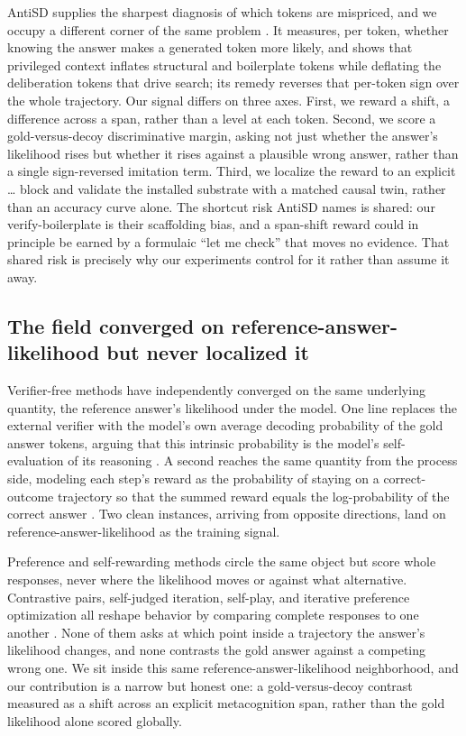 AntiSD supplies the sharpest diagnosis of which tokens are mispriced, and we
occupy a different corner of the same problem \citep{shen2026antisd}. It measures,
per token, whether knowing the answer makes a generated token more likely, and
shows that privileged context inflates structural and boilerplate tokens while
deflating the deliberation tokens that drive search; its remedy reverses that
per-token sign over the whole trajectory. Our signal differs on three axes.
First, we reward a shift, a difference across a span, rather than a level at each
token. Second, we score a gold-versus-decoy discriminative margin, asking not
just whether the answer's likelihood rises but whether it rises against a
plausible wrong answer, rather than a single sign-reversed imitation term.
Third, we localize the reward to an explicit \metaopen{}\dots\metaclose{} block
and validate the installed substrate with a matched causal twin, rather than an
accuracy curve alone. The shortcut risk AntiSD names is shared: our
verify-boilerplate is their scaffolding bias, and a span-shift reward could in
principle be earned by a formulaic ``let me check'' that moves no evidence. That
shared risk is precisely why our experiments control for it rather than assume it
away.

\subsection{The field converged on reference-answer-likelihood but never localized it}
\label{sec:related:likelihood}

Verifier-free methods have independently converged on the same underlying
quantity, the reference answer's likelihood under the model. One line replaces
the external verifier with the model's own average decoding probability of the
gold answer tokens, arguing that this intrinsic probability is the model's
self-evaluation of its reasoning \citep{yu2025rlpr}. A second reaches the same
quantity from the process side, modeling each step's reward as the probability
of staying on a correct-outcome trajectory so that the summed reward equals the
log-probability of the correct answer \citep{zhang2025crm}. Two clean instances,
arriving from opposite directions, land on reference-answer-likelihood as the
training signal.

Preference and self-rewarding methods circle the same object but score whole
responses, never where the likelihood moves or against what alternative.
Contrastive pairs, self-judged iteration, self-play, and iterative preference
optimization all reshape behavior by comparing complete responses to one another
\citep{ko2024distillm2, yang2024rlcd, yuan2024selfrewarding, wu2024metarewarding,
wu2024sppo, xu2024iterativedpo, fourhabits2026wn}. None of them asks at which
point inside a trajectory the answer's likelihood changes, and none contrasts the
gold answer against a competing wrong one. We sit inside this same
reference-answer-likelihood neighborhood, and our contribution is a narrow but
honest one: a gold-versus-decoy contrast measured as a shift across an explicit
metacognition span, rather than the gold likelihood alone scored globally.

